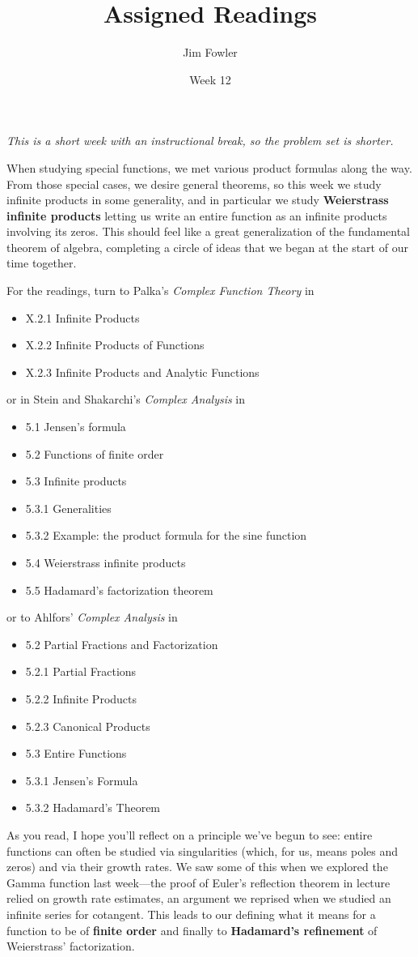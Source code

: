 \documentclass{homework}
\author{Jim Fowler}
\title{Assigned Readings}
\date{Week 12}
\begin{document}
\maketitle

\textit{This is a short week with an instructional break, so the
  problem set is shorter.}

When studying special functions, we met various product formulas along
the way.  From those special cases, we desire general theorems, so
this week we study infinite products in some generality, and in
particular we study \textbf{Weierstrass infinite products} letting us
write an entire function as an infinite products involving its zeros.
This should feel like a great generalization of the fundamental
theorem of algebra, completing a circle of ideas that we began at the
start of our time together.

For the readings, turn to Palka's
\textit{Complex Function Theory} in
\begin{itemize}  
\item X.2.1 Infinite Products
\item X.2.2 Infinite Products of Functions
\item X.2.3 Infinite Products and Analytic Functions
\end{itemize}
or in Stein and Shakarchi's \textit{Complex Analysis} in
\begin{itemize}
\item 5.1 Jensen's formula
\item 5.2 Functions of finite order
\item 5.3 Infinite products
\item 5.3.1 Generalities
\item 5.3.2 Example: the product formula for the sine function
\item 5.4 Weierstrass infinite products
\item 5.5 Hadamard's factorization theorem
\end{itemize}
or to Ahlfors' \textit{Complex Analysis} in
\begin{itemize}
\item 5.2 Partial Fractions and Factorization
\item 5.2.1 Partial Fractions
\item 5.2.2 Infinite Products
\item 5.2.3 Canonical Products
\item 5.3 Entire Functions
\item 5.3.1 Jensen's Formula
\item 5.3.2 Hadamard's Theorem
\end{itemize}

As you read, I hope you'll reflect on a principle we've begun to see:
entire functions can often be studied via singularities (which, for
us, means poles and zeros) and via their growth rates.  We saw some of
this when we explored the Gamma function last week---the proof of
Euler's reflection theorem in lecture relied on growth rate estimates,
an argument we reprised when we studied an infinite series for
cotangent.  This leads to our defining what it means for a function to
be of \textbf{finite order} and finally to \textbf{Hadamard's
  refinement} of Weierstrass' factorization.
\end{document}
